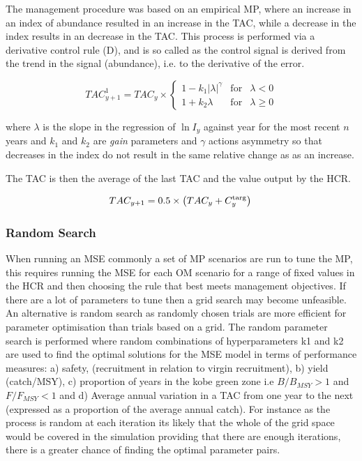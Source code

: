 \documentclass[preprint,review,12pt]{elsarticle}
\begin{document}
The management procedure was based on an empirical MP, where an increase in an index of abundance resulted in an increase in the TAC, while a decrease in the index results in an decrease in the TAC. This process is performed via a derivative control rule (D), and is so called as the control signal is derived from the trend in the signal (abundance), i.e. to the derivative of the error. 


\begin{equation}
 TAC^1_{y+1}=TAC_y\times 
 \left\{\begin{array}{rcl}  
    {1-k_1|\lambda|^{\gamma}} & \mbox{for} & \lambda<0\\[0.35cm]
    {1+k_2\lambda} & \mbox{for} & \lambda\geq 0 
 \end{array}\right.
\end{equation}

where $\lambda$ is the slope in the regression of $\ln I_y$ against year for the most recent $n$ years and $k_1$ and $k_2$ are \textit{gain} parameters and $\gamma$ actions asymmetry so that decreases in the index do not result in the same relative change as as an increase.

The TAC is then the average of the last TAC and the value output by the HCR. 

\begin{equation} 
     TAC_{y+1} = 0.5\times\left(TAC_y+C^{\rm targ}_y\right)\\
\end{equation}

\subsubsection{Random Search}


When running an MSE commonly a set of MP scenarios are run to tune the MP, this requires running the MSE for each OM scenario for a range of fixed values in the HCR and then choosing the rule that best meets management objectives. If there are a lot of parameters to tune then a grid search may become unfeasible. An alternative is random search \cite{bergstra2012random} as randomly chosen trials are more efficient for parameter optimisation than trials based on a grid. The random parameter search is performed where random combinations of hyperparameters k1 and k2 are used to find the optimal solutions for the MSE model in terms of performance measures: a) safety, (recruitment in relation to virgin recruitment), b) yield (catch/MSY), c) proportion of years in the kobe green zone i.e $B/B_{MSY} > 1$ and $F/F_{MSY} < 1$ and d) Average annual variation in a TAC from one year to the next (expressed as a proportion of the average annual catch). For instance as the process is random at each iteration its likely that the whole of the grid space would be covered in the simulation providing that there are enough iterations, there is a greater chance of finding the optimal parameter pairs. 
\end{document}
